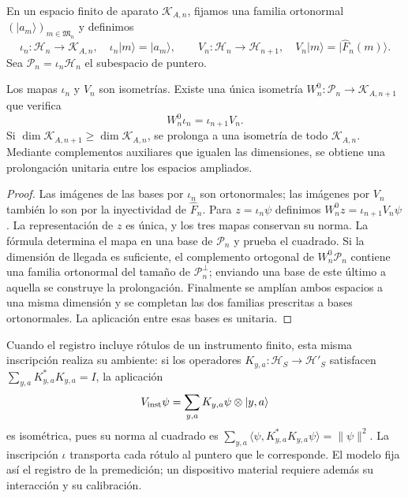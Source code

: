En un espacio finito de aparato \(\mathcal K_{A,n}\), fijamos una
familia ortonormal \((|a_m\rangle)_{m\in\mathfrak M_n}\) y definimos
\[
 \iota_n:\mathcal H_n\longrightarrow\mathcal K_{A,n},
 \quad \iota_n|m\rangle=|a_m\rangle,
 \qquad
 V_n:\mathcal H_n\longrightarrow\mathcal H_{n+1},
 \quad V_n|m\rangle=|\widehat F_n(m)\rangle.
\]
Sea \(\mathcal P_n=\iota_n\mathcal H_n\) el subespacio de puntero.

\begin{theorem}
\label{vii:vii:thm:observador-entrelazador}
Los mapas \(\iota_n\) y \(V_n\) son isometrías. Existe una única
isometría \(W_n^0:\mathcal P_n\longrightarrow\mathcal K_{A,n+1}\)
que verifica
\begin{equation}
 W_n^0\iota_n=\iota_{n+1}V_n.
 \label{vii:vii:eq:observador-cuadrado}
\end{equation}
Si \(\dim\mathcal K_{A,n+1}\geq\dim\mathcal K_{A,n}\),
se prolonga a una isometría de todo \(\mathcal K_{A,n}\).
Mediante complementos auxiliares que igualen las dimensiones, se obtiene
una prolongación unitaria entre los espacios ampliados.
\end{theorem}

\begin{proof}
Las imágenes de las bases por \(\iota_n\) son ortonormales; las
imágenes por \(V_n\) también lo son por la inyectividad de
\(\widehat F_n\). Para \(z=\iota_n\psi\) definimos
\(W_n^0z=\iota_{n+1}V_n\psi\). La representación de \(z\) es única,
y los tres mapas conservan su norma. La fórmula determina el mapa en
una base de \(\mathcal P_n\) y prueba el cuadrado.
Si la dimensión de llegada es suficiente, el complemento ortogonal de
\(W_n^0\mathcal P_n\) contiene una familia ortonormal del tamaño de
\(\mathcal P_n^\perp\); enviando una base de este último a aquella
se construye la prolongación. Finalmente se amplían ambos espacios a
una misma dimensión y se completan las dos familias prescritas a bases
ortonormales. La aplicación entre esas bases es unitaria.
\end{proof}

Cuando el registro incluye rótulos de un instrumento finito, esta misma
inscripción realiza su ambiente: si los operadores
\(K_{y,a}:\mathcal H_S\to\mathcal H'_S\) satisfacen
\(\sum_{y,a}K_{y,a}^*K_{y,a}=I\), la aplicación
\[
 V_{\rm inst}\psi=\sum_{y,a}K_{y,a}\psi\otimes|y,a\rangle
\]
es isométrica, pues su norma al cuadrado es
\(\sum_{y,a}\langle\psi,K_{y,a}^*K_{y,a}\psi\rangle=\|\psi\|^2\).
La inscripción \(\iota\) transporta cada rótulo al puntero que le
corresponde. El modelo fija así el registro de la premedición; un
dispositivo material requiere además su interacción y su calibración.

